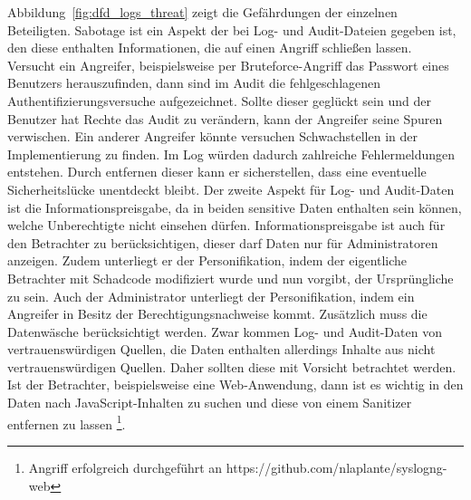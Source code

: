 \documentclass[11pt,a4paper]{report}
\begin{document}
Abbildung~\ref{fig:dfd_logs_threat} zeigt die Gefährdungen der einzelnen Beteiligten. Sabotage ist ein Aspekt der bei Log- und Audit-Dateien gegeben ist, den diese enthalten Informationen, die auf einen Angriff schließen lassen. Versucht ein Angreifer, beispielsweise per Bruteforce-Angriff das Passwort eines Benutzers herauszufinden, dann sind im Audit die fehlgeschlagenen Authentifizierungsversuche aufgezeichnet. Sollte dieser geglückt sein und der Benutzer hat Rechte das Audit zu verändern, kann der Angreifer seine Spuren verwischen. Ein anderer Angreifer könnte versuchen Schwachstellen in der Implementierung zu finden. Im Log würden dadurch zahlreiche Fehlermeldungen entstehen. Durch entfernen dieser kann er sicherstellen, dass eine eventuelle Sicherheitslücke unentdeckt bleibt. Der zweite Aspekt für Log- und Audit-Daten ist die Informationspreisgabe, da in beiden sensitive Daten enthalten sein können, welche Unberechtigte nicht einsehen dürfen. Informationspreisgabe ist auch für den Betrachter zu berücksichtigen, dieser darf Daten nur für Administratoren anzeigen. Zudem unterliegt er der Personifikation, indem der eigentliche Betrachter mit Schadcode modifiziert wurde und nun vorgibt, der Ursprüngliche zu sein. Auch der Administrator unterliegt der Personifikation, indem ein Angreifer in Besitz der Berechtigungsnachweise kommt. Zusätzlich muss die Datenwäsche berücksichtigt werden. Zwar kommen Log- und Audit-Daten von vertrauenswürdigen Quellen, die Daten enthalten allerdings Inhalte aus nicht vertrauenswürdigen Quellen. Daher sollten diese mit Vorsicht betrachtet werden. Ist der Betrachter, beispielsweise eine Web-Anwendung, dann ist es wichtig in den Daten nach JavaScript-Inhalten zu suchen und diese von einem Sanitizer entfernen zu lassen \footnote{Angriff erfolgreich durchgeführt an https://github.com/nlaplante/syslogng-web}.
\end{document}
